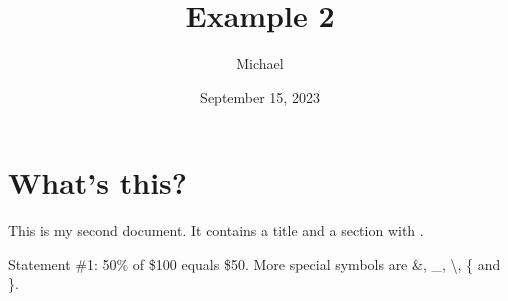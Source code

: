 \documentclass[a4paper,11pt]{article} %
\title{Example 2}
\author{Michael}
\date{September 15, 2023}  %
\begin{document}
\maketitle %
\section{What's this?} %
This is my second document. It contains a title and a%
section with .

Statement \#1: 
50\% of \$100 equals \$50.
More special symbols are \&, \_, \textbackslash, \{ and \}.
\end{document}
